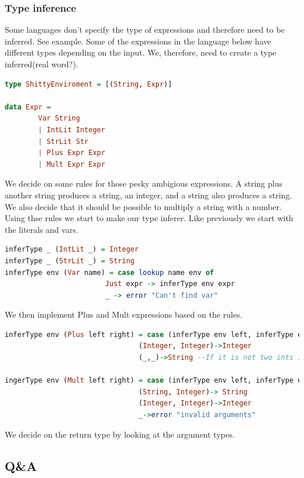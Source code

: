 \documentclass{article}
\begin{document}
            \subsubsection{Type inference}
            Some languages don't specify the type of expressions and therefore need to be inferred. See example.
            Some of the expressions in the language below have different types depending on the input. We, therefore, need to create a type inferred(real word?).
            \begin{lstlisting}[language=Haskell]
type ShittyEnviroment = [(String, Expr)]

data Expr = 
        Var String
        | IntLit Integer
        | StrLit Str
        | Plus Expr Expr
        | Mult Expr Expr
            \end{lstlisting}
            We decide on some rules for those pesky ambigious expressions. A string plus another string produces a string, an integer, and a string also produces a string.
            We also decide that it should be possible to multiply a string with a number. Using thse rules we start to make our type inferer.
            Like previously we start with the literals and vars.
            \begin{lstlisting}[language=Haskell]
inferType _ (IntLit _) = Integer
inferType _ (StrLit _) = String
inferType env (Var name) = case lookup name env of
                        Just expr -> inferType env expr
                        _ -> error "Can't find var"
            \end{lstlisting}
            We then implement Plus and Mult expressions based on the rules.
            \begin{lstlisting}[language=Haskell]
inferType env (Plus left right) = case (inferType env left, inferType env right) of
                                (Integer, Integer)->Integer
                                (_,_)->String --If it is not two ints it's a string!

ingerType env (Mult left right) = case (inferType env left, inferType env right) of
                                (String, Integer)-> String
                                (Integer, Integer)->Integer
                                _->error "invalid arguments"
            \end{lstlisting}
            We decide on the return type by looking at the argument types.
    \subsection{Q\&A}
\end{document}
